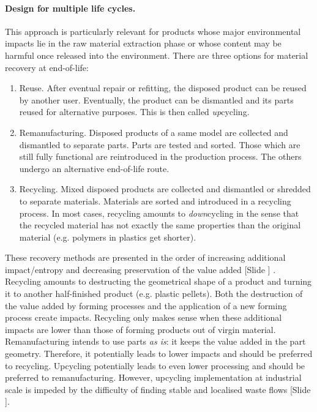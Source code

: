 \documentclass{article}
\newcounter{slide}
\begin{document}
\paragraph{Design for multiple life cycles.}
\label{sec:DfR}
This approach is particularly relevant for products whose major environmental impacts lie in the raw material extraction phase or whose content may be harmful once released into the environment. There are three options for material recovery at end-of-life:
\begin{enumerate}
	\item Reuse. After eventual repair or refitting, the disposed product can be reused by another user. Eventually, the product can be dismantled and its parts reused for alternative purposes. This is then called \emph{up}cycling. 
	\item Remanufacturing. Disposed products of a same model are collected and dismantled to separate parts. Parts are tested and sorted. Those which are still fully functional are reintroduced in the production process. The others undergo an alternative end-of-life route.
	\item Recycling. Mixed disposed products are collected and dismantled or shredded to separate materials. Materials are sorted and introduced in a recycling process. In most cases, recycling amounts to \emph{down}cycling in the sense that the recycled material has not exactly the same properties than the original material (e.g. polymers in plastics get shorter).
\end{enumerate}
These recovery methods are presented in the order of increasing additional impact/entropy and decreasing preservation of the value added {\color{blue}[Slide ]} \cite{mihelcicSustainabilityScienceEngineering2003}. Recycling amounts to destructing the geometrical shape of a product and turning it to another half-finished product (e.g. plastic pellets). Both the destruction of the value added by forming processes and the application of a new forming process create impacts. Recycling only makes sense when these additional impacts are lower than those of forming products out of virgin material. Remanufacturing intends to use parts \emph{as is}: it keeps the value added in the part geometry. Therefore, it potentially leads to lower impacts and should be preferred to recycling. Upcycling potentially leads to even lower processing and should be preferred to remanufacturing. However, upcycling implementation at industrial scale is impeded by the difficulty of finding stable and localised waste flows {\color{blue}[Slide ]}.
\end{document}
